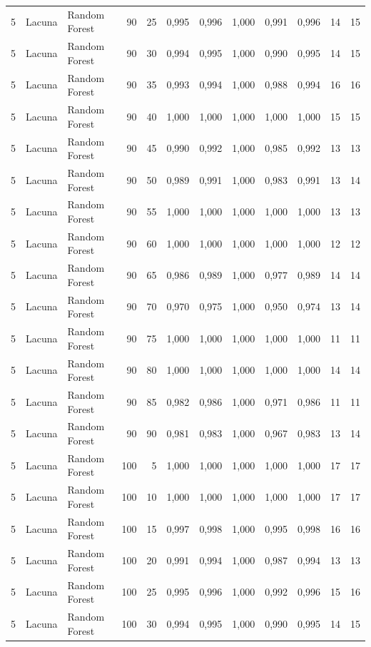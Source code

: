 \begin{longtable}{@{}rllrrrrrrrrr@{}}
5 & Lacuna & Random Forest & 90 & 25 & 0,995 & 0,996 & 1,000 & 0,991 & 0,996 & 14 & 15 \\
5 & Lacuna & Random Forest & 90 & 30 & 0,994 & 0,995 & 1,000 & 0,990 & 0,995 & 14 & 15 \\
5 & Lacuna & Random Forest & 90 & 35 & 0,993 & 0,994 & 1,000 & 0,988 & 0,994 & 16 & 16 \\
5 & Lacuna & Random Forest & 90 & 40 & 1,000 & 1,000 & 1,000 & 1,000 & 1,000 & 15 & 15 \\
5 & Lacuna & Random Forest & 90 & 45 & 0,990 & 0,992 & 1,000 & 0,985 & 0,992 & 13 & 13 \\
5 & Lacuna & Random Forest & 90 & 50 & 0,989 & 0,991 & 1,000 & 0,983 & 0,991 & 13 & 14 \\
5 & Lacuna & Random Forest & 90 & 55 & 1,000 & 1,000 & 1,000 & 1,000 & 1,000 & 13 & 13 \\
5 & Lacuna & Random Forest & 90 & 60 & 1,000 & 1,000 & 1,000 & 1,000 & 1,000 & 12 & 12 \\
5 & Lacuna & Random Forest & 90 & 65 & 0,986 & 0,989 & 1,000 & 0,977 & 0,989 & 14 & 14 \\
5 & Lacuna & Random Forest & 90 & 70 & 0,970 & 0,975 & 1,000 & 0,950 & 0,974 & 13 & 14 \\
5 & Lacuna & Random Forest & 90 & 75 & 1,000 & 1,000 & 1,000 & 1,000 & 1,000 & 11 & 11 \\
5 & Lacuna & Random Forest & 90 & 80 & 1,000 & 1,000 & 1,000 & 1,000 & 1,000 & 14 & 14 \\
5 & Lacuna & Random Forest & 90 & 85 & 0,982 & 0,986 & 1,000 & 0,971 & 0,986 & 11 & 11 \\
5 & Lacuna & Random Forest & 90 & 90 & 0,981 & 0,983 & 1,000 & 0,967 & 0,983 & 13 & 14 \\
5 & Lacuna & Random Forest & 100 & 5 & 1,000 & 1,000 & 1,000 & 1,000 & 1,000 & 17 & 17 \\
5 & Lacuna & Random Forest & 100 & 10 & 1,000 & 1,000 & 1,000 & 1,000 & 1,000 & 17 & 17 \\
5 & Lacuna & Random Forest & 100 & 15 & 0,997 & 0,998 & 1,000 & 0,995 & 0,998 & 16 & 16 \\
5 & Lacuna & Random Forest & 100 & 20 & 0,991 & 0,994 & 1,000 & 0,987 & 0,994 & 13 & 13 \\
5 & Lacuna & Random Forest & 100 & 25 & 0,995 & 0,996 & 1,000 & 0,992 & 0,996 & 15 & 16 \\
5 & Lacuna & Random Forest & 100 & 30 & 0,994 & 0,995 & 1,000 & 0,990 & 0,995 & 14 & 15 \\

\end{longtable}

